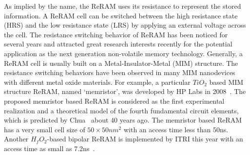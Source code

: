 As implied by the name, the ReRAM uses its resistance to represent the stored information. A ReRAM cell can be switched between the high resistance state (HRS) and the low resistance state (LRS) by applying an external voltage across the cell. The resistance switching behavior of ReRAM has been noticed for several years and attracted great research interests recently for the potential application as the next generation non-volatile memory technology. Generally, a ReRAM cell is usually built on a Metal-Insulator-Metal (MIM) structure. The resistance switching behaviors have been observed in many MIM nanodevices with different metal oxide materials. For example, a particular $TiO_2$ based MIM structure ReRAM, named `memristor', was developed by HP Labs in 2008~\cite{memristor:missing}. The proposed memristor based ReRAM is considered as the first experimental realization and a theoretical model of the fourth fundamental circuit elements, which is predicted by Chua~\cite{memristor:chua} about 40 years ago. The memristor based ReRAM has a very small cell size of $50\times50 nm^2$ with an access time less than 50ns. Another $H_fO_2$-based bipolar ReRAM is implemented by ITRI this year with an access time as small as 7.2ns~\cite{ReRAM_ISSCC2011_Sheu}.


